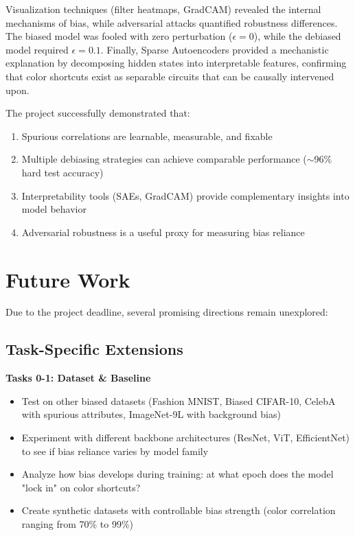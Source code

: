 \documentclass[9pt,a4paper,twocolumn,twoside]{tau-class/tau}
\begin{document}
    Visualization techniques (filter heatmaps, GradCAM) revealed the internal mechanisms of bias, while adversarial attacks quantified robustness differences. The biased model was fooled with zero perturbation ($\epsilon = 0$), while the debiased model required $\epsilon = 0.1$. Finally, Sparse Autoencoders provided a mechanistic explanation by decomposing hidden states into interpretable features, confirming that color shortcuts exist as separable circuits that can be causally intervened upon.

    The project successfully demonstrated that:
    \begin{enumerate}
        \item Spurious correlations are learnable, measurable, and fixable
        \item Multiple debiasing strategies can achieve comparable performance ($\sim$96\% hard test accuracy)
        \item Interpretability tools (SAEs, GradCAM) provide complementary insights into model behavior
        \item Adversarial robustness is a useful proxy for measuring bias reliance
    \end{enumerate}

\section{Future Work}

    Due to the project deadline, several promising directions remain unexplored:

    \subsection{Task-Specific Extensions}

        \textbf{Tasks 0-1: Dataset \& Baseline}
        \begin{itemize}
            \item Test on other biased datasets (Fashion MNIST, Biased CIFAR-10, CelebA with spurious attributes, ImageNet-9L with background bias)
            \item Experiment with different backbone architectures (ResNet, ViT, EfficientNet) to see if bias reliance varies by model family
            \item Analyze how bias develops during training: at what epoch does the model "lock in" on color shortcuts?
            \item Create synthetic datasets with controllable bias strength (color correlation ranging from 70\% to 99\%)
        \end{itemize}
\end{document}
